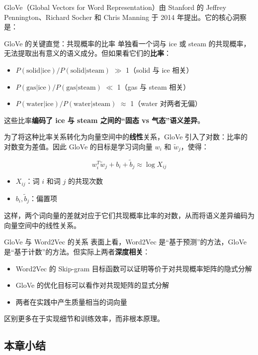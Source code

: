 \documentclass[a4paper]{article}
\begin{document}
GloVe（Global Vectors for Word Representation）由 Stanford 的 Jeffrey Pennington、Richard Socher 和 Chris Manning 于 2014 年提出。它的核心洞察是：

\begin{importantbox}{GloVe 的关键直觉：共现概率的比率}
单独看一个词与 ice 或 steam 的共现概率，无法提取出有意义的语义成分。但如果看它们的\textbf{比率}：
\begin{itemize}
    \item $P(\text{solid} | \text{ice}) / P(\text{solid} | \text{steam})$ $\gg$ 1（solid 与 ice 相关）
    \item $P(\text{gas} | \text{ice}) / P(\text{gas} | \text{steam})$ $\ll$ 1（gas 与 steam 相关）
    \item $P(\text{water} | \text{ice}) / P(\text{water} | \text{steam})$ $\approx$ 1（water 对两者无偏）
\end{itemize}
这些比率\textbf{编码了 ice 与 steam 之间的``固态 vs 气态''语义差异}。
\end{importantbox}

为了将这种比率关系转化为向量空间中的\textbf{线性}关系，GloVe 引入了对数：比率的对数变为差值。因此 GloVe 的目标是学习词向量 $w_i$ 和 $\tilde{w}_j$，使得：

$$w_i^T \tilde{w}_j + b_i + \tilde{b}_j \approx \log X_{ij}$$

\begin{itemize}
    \item $X_{ij}$：词 $i$ 和词 $j$ 的共现次数
    \item $b_i, \tilde{b}_j$：偏置项
\end{itemize}

这样，两个词向量的差就对应于它们共现概率比率的对数，从而将语义差异编码为向量空间中的线性关系。

\begin{knowledgebox}{GloVe 与 Word2Vec 的关系}
表面上看，Word2Vec 是``基于预测''的方法，GloVe 是``基于计数''的方法。但实际上两者\textbf{深度相关}：
\begin{itemize}
    \item Word2Vec 的 Skip-gram 目标函数可以证明等价于对共现概率矩阵的隐式分解
    \item GloVe 的优化目标可以看作对共现矩阵的显式分解
    \item 两者在实践中产生质量相当的词向量
\end{itemize}
区别更多在于实现细节和训练效率，而非根本原理。
\end{knowledgebox}

\subsection{本章小结}
\end{document}

